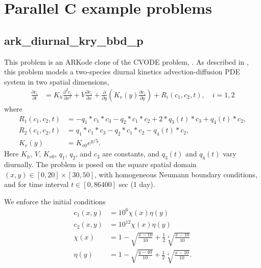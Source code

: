 \documentclass[letterpaper,10pt,english]{sphinxmanual}
\begin{document}
\chapter{Parallel C example problems}
\label{\detokenize{c_parallel:parallel-c}}\label{\detokenize{c_parallel::doc}}\label{\detokenize{c_parallel:parallel-c-example-problems}}

\section{ark\_diurnal\_kry\_bbd\_p}
\label{\detokenize{c_parallel:id1}}\label{\detokenize{c_parallel:ark-diurnal-kry-bbd-p}}
This problem is an ARKode clone of the CVODE problem,
.  As described in \label{\detokenize{c_parallel:id2}}{\hyperref[\detokenize{References:hsr2017}]{\sphinxcrossref{{[}HSR2017{]}}}}, this problem
models a two-species diurnal kinetics advection-diffusion PDE system
in two spatial dimensions,
\begin{equation*}
\begin{split}\frac{\partial c_i}{\partial t} &=
  K_h \frac{\partial^2 c_i}{\partial x^2} +
  V \frac{\partial     c_i}{\partial x} +
  \frac{\partial}{\partial y}\left( K_v(y)
  \frac{\partial c_i}{\partial y}\right) +
  R_i(c_1,c_2,t),\quad i=1,2\end{split}
\end{equation*}
where
\begin{equation*}
\begin{split}R_1(c_1,c_2,t) &= -q_1*c_1*c_3 - q_2*c_1*c_2 + 2*q_3(t)*c_3 + q_4(t)*c_2, \\
R_2(c_1,c_2,t) &=  q_1*c_1*c_3 - q_2*c_1*c_2 - q_4(t)*c_2, \\
K_v(y) &= K_{v0} e^{y/5}.\end{split}
\end{equation*}
Here \(K_h\), \(V\), \(K_{v0}\), \(q_1\), \(q_2\),
and \(c_3\) are constants, and \(q_3(t)\) and \(q_4(t)\)
vary diurnally.  The problem is posed on the square spatial domain
\((x,y) \in [0,20]\times[30,50]\), with homogeneous Neumann
boundary conditions, and for time interval \(t\in [0,86400]\) sec
(1 day).

We enforce the initial conditions
\begin{equation*}
\begin{split}c_1(x,y) &=  10^6 \chi(x)\eta(y) \\
c_2(x,y) &=  10^{12} \chi(x)\eta(y) \\
\chi(x) &= 1 - \sqrt{\frac{x - 10}{10}} + \frac12 \sqrt[4]{\frac{x - 10}{10}} \\
\eta(y) &= 1 - \sqrt{\frac{y - 40}{10}} + \frac12 \sqrt[4]{\frac{x - 10}{10}}.\end{split}
\end{equation*}
\end{document}

